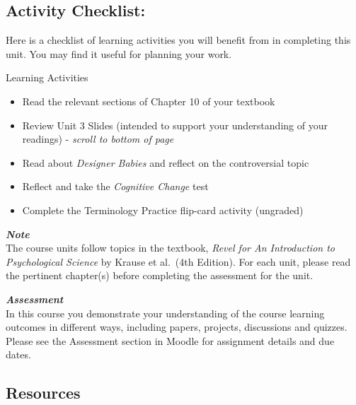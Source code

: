 \documentclass[
]{book}
\providecommand{\tightlist}{%
  \setlength{\itemsep}{0pt}\setlength{\parskip}{0pt}}
\begin{document}
\hypertarget{activity-checklist-2}{%
\subsection*{Activity Checklist:}\label{activity-checklist-2}}

Here is a checklist of learning activities you will benefit from in completing this unit. You may find it useful for planning your work.

\begin{reflect}
{Learning Activities}

\begin{itemize}
\tightlist
\item
  Read the relevant sections of Chapter 10 of your textbook
\item
  Review Unit 3 Slides (intended to support your understanding of your readings) - \emph{scroll to bottom of page}
\item
  Read about \emph{Designer Babies} and reflect on the controversial topic
\item
  Reflect and take the \emph{Cognitive Change} test
\item
  Complete the Terminology Practice flip-card activity (ungraded)
\end{itemize}
\end{reflect}

\begin{caution}
\textbf{\emph{Note}}\\
The course units follow topics in the textbook, \emph{Revel for An Introduction to Psychological Science} by Krause et al.~(4th Edition). For each unit, please read the pertinent chapter(s) before completing the assessment for the unit.
\end{caution}

\begin{assessment}
\textbf{\emph{Assessment}}\\
In this course you demonstrate your understanding of the course learning outcomes in different ways, including papers, projects, discussions and quizzes. Please see the Assessment section in Moodle for assignment details and due dates.
\end{assessment}

\hypertarget{resources-2}{%
\subsection*{Resources}\label{resources-2}}
\end{document}
